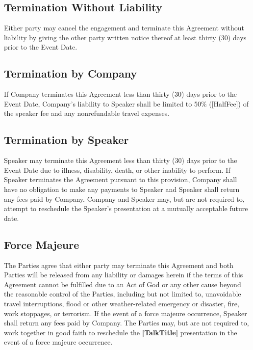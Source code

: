 \documentclass[a4paper,12pt]{article} %
\newcommand{\HalfFee}{[HalfFee]}
\newcommand{\TalkTitle}{[TalkTitle]}
\begin{document}
\subsection{Termination Without Liability}

Either party may cancel the engagement and terminate this Agreement without liability by giving the other party written notice thereof at least thirty (30) days prior to the Event Date.

\subsection{Termination by Company}

If Company terminates this Agreement less than thirty (30) days prior to the Event Date, Company's liability to Speaker shall be limited to 50\% (\HalfFee) of the speaker fee and any nonrefundable travel expenses.

\subsection{Termination by Speaker}

Speaker may terminate this Agreement less than thirty (30) days prior to the Event Date due to illness, disability, death, or other inability to perform. If Speaker terminates the Agreement pursuant to this provision, Company shall have no obligation to make any payments to Speaker and Speaker shall return any fees paid by Company. Company and Speaker may, but are not required to, attempt to reschedule the Speaker's presentation at a mutually acceptable future date.

\subsection{Force Majeure}

The Parties agree that either party may terminate this Agreement and both Parties will be released from any liability or damages herein if the terms of this Agreement cannot be fulfilled due to an Act of God or any other cause beyond the reasonable control of the Parties, including but not limited to, unavoidable travel interruptions, flood or other weather-related emergency or disaster, fire, work stoppages, or terrorism. If the event of a force majeure occurrence, Speaker shall return any fees paid by Company. The Parties may, but are not required to, work together in good faith to reschedule the \textbf{\TalkTitle} presentation in the event of a force majeure occurrence.
\end{document}
